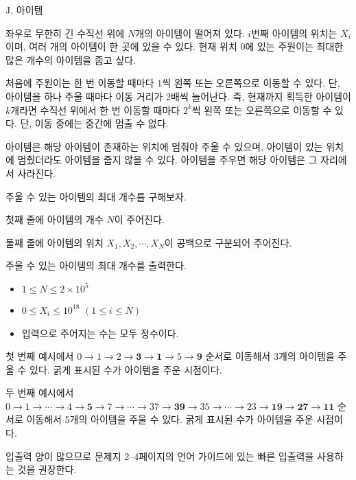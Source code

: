 \def\probtitle{아이템}
\def\probno{J}

\begin{problem}{\probno{}. \probtitle{}}

좌우로 무한히 긴 수직선 위에 $N$개의 아이템이 떨어져 있다. $i$번째 아이템의 위치는 $X_i$이며, 여러 개의 아이템이 한 곳에 있을 수 있다. 현재 위치 $0$에 있는 주원이는 최대한 많은 개수의 아이템을 줍고 싶다.

처음에 주원이는 한 번 이동할 때마다 $1$씩 왼쪽 또는 오른쪽으로 이동할 수 있다. 단, 아이템을 하나 주울 때마다 이동 거리가 2배씩 늘어난다. 즉, 현재까지 획득한 아이템이 $k$개라면 수직선 위에서 한 번 이동할 때마다 $2^k$씩 왼쪽 또는 오른쪽으로 이동할 수 있다. 단, 이동 중에는 중간에 멈출 수 없다. 

아이템은 해당 아이템이 존재하는 위치에 멈춰야 주울 수 있으며, 아이템이 있는 위치에 멈췄더라도 아이템을 줍지 않을 수 있다. 아이템을 주우면 해당 아이템은 그 자리에서 사라진다.

주울 수 있는 아이템의 최대 개수를 구해보자.

\InputFile

첫째 줄에 아이템의 개수 $N$이 주어진다.

둘째 줄에 아이템의 위치 $X_1, X_2, \cdots, X_N$이 공백으로 구분되어 주어진다.

\OutputFile

주울 수 있는 아이템의 최대 개수를 출력한다.

\Constraints

\begin{itemize}[noitemsep]
    \item $1 \leq N \leq 2 \times 10^5$
    \item $0 \leq X_i \leq 10^{18}$ $(1 \le i \le N)$
    \item 입력으로 주어지는 수는 모두 정수이다.
\end{itemize}

\Example

\begin{example}
\end{example}

첫 번째 예시에서 $0 \rightarrow 1 \rightarrow 2 \rightarrow \textbf{3} \rightarrow \textbf{1} \rightarrow 5 \rightarrow \textbf{9}$ 순서로 이동해서 3개의 아이템을 주울 수 있다. 굵게 표시된 수가 아이템을 주운 시점이다.

두 번째 예시에서 $0 \rightarrow 1 \rightarrow \cdots \rightarrow 4 \rightarrow \textbf{5} \rightarrow 7 \rightarrow \cdots \rightarrow 37 \rightarrow \textbf{39} \rightarrow 35  \rightarrow \cdots \rightarrow 23 \rightarrow \textbf{19} \rightarrow \textbf{27} \rightarrow \textbf{11}$ 순서로 이동해서 5개의 아이템을 주울 수 있다. 굵게 표시된 수가 아이템을 주운 시점이다.


\Notes
입출력 양이 많으므로 문제지 2--4페이지의 언어 가이드에 있는 빠른 입출력을 사용하는 것을 권장한다.



\end{problem}